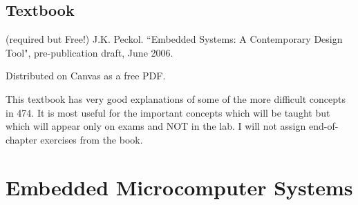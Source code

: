 
\subsection{Textbook}
(required but Free!)
 J.K. Peckol. ``Embedded Systems: A Contemporary Design Tool",
pre-publication draft, June 2006.   

Distributed on Canvas as a free 
PDF. 

This textbook has very good explanations of some of the more difficult concepts in
474.  It is most useful for the important concepts which will be taught but which
will appear only on exams and NOT in the lab.
I will not assign end-of-chapter exercises from the book.


\section{Embedded Microcomputer Systems}

